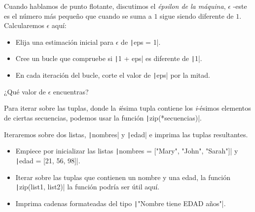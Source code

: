 \begin{questions}
	\question

	Cuando hablamos de punto flotante, discutimos el
	\textit{épsilon de la máquina}, $\epsilon$ -este es el número más
	pequeño que cuando se suma a $1$ sigue siendo diferente de $1$.
	Calcularemos $\epsilon$ aquí:
	\begin{itemize}
		\item

		      Elija una estimación inicial para $\epsilon$ de
		      \texttt|eps = 1|.

		\item

		      Cree un bucle que compruebe si
		      \texttt|1 + eps| es diferente de
		      \texttt|1|.

		\item

		      En cada iteración del bucle, corte el valor de
		      \texttt|eps| por la mitad.
	\end{itemize}
	¿Qué valor de $\epsilon$ encuentras?

	\question

	Para iterar sobre las tuplas, donde la \textit{i}ésima tupla contiene
	los \textit{i}-ésimos elementos de ciertas secuencias, podemos usar la función
	\texttt|zip(*secuencias)|.

	Iteraremos sobre dos listas, \texttt|nombres| y
	\texttt|edad| e imprima las tuplas resultantes.

	\begin{itemize}
		\item

		      Empiece por inicializar las listas
		      \texttt|nombres = ["Mary", "John", "Sarah"]| y
		      \texttt|edad = [21, 56, 98]|.

		\item


		      Iterar sobre las tuplas que contienen un nombre y una edad,
		      la función \texttt|zip(list1, list2)| la
		      función podría ser útil aquí.

		\item

		      Imprima cadenas formateadas del tipo
		      \texttt|"Nombre tiene EDAD años"|.
	\end{itemize}

	\question


\end{questions}
